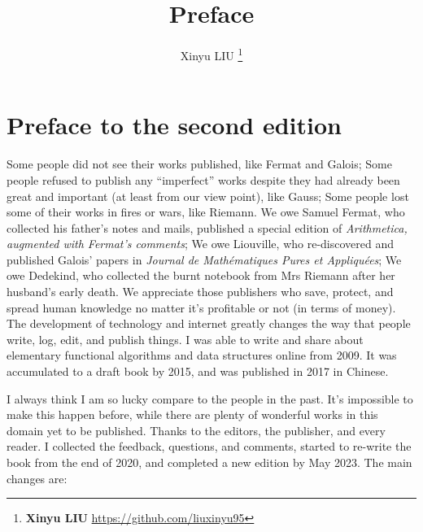 \documentclass[b5paper]{article}
\begin{document}
\title{Preface}

\author{Xinyu LIU
\thanks{{\bfseries Xinyu LIU} \newline
  \url{https://github.com/liuxinyu95} \newline}
  }

\maketitle
\fi


\chapter*{Preface to the second edition}

Some people did not see their works published, like Fermat and Galois; Some people refused to publish any \enquote{imperfect} works despite they had already been great and important (at least from our view point), like Gauss; Some people lost some of their works in fires or wars, like Riemann. We owe Samuel Fermat, who collected his father's notes and mails, published a special edition of {\em Arithmetica, augmented with Fermat's comments}; We owe Liouville, who re-discovered and published Galois' papers in {\em Journal de Mathématiques Pures et Appliquées}; We owe Dedekind, who collected the burnt notebook from Mrs Riemann after her husband's early death. We appreciate those publishers who save, protect, and spread human knowledge no matter it's profitable or not (in terms of money). The development of technology and internet greatly changes the way that people write, log, edit, and publish things. I was able to write and share about elementary functional algorithms and data structures online from 2009. It was accumulated to a draft book by 2015, and was published in 2017 in Chinese.

I always think I am so lucky compare to the people in the past. It's impossible to make this happen before, while there are plenty of wonderful works in this domain yet to be published. Thanks to the editors, the publisher, and every reader. I collected the feedback, questions, and comments, started to re-write the book from the end of 2020, and completed a new edition by May 2023. The main changes are:
\end{document}
